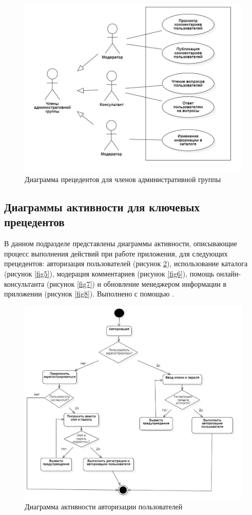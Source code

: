 \documentclass[14pt]{extreport}
\begin{document}
\begin{figure}[H]
\centerline{\includegraphics[width=0.7\linewidth]{adm}}
\caption{Диаграмма прецедентов для членов административной группы}
\label{fig3}
\end{figure}

\newpage
\subsection{Диаграммы активности для ключевых прецедентов}

В данном подразделе представлены диаграммы активности, описывающие процесс выполнения действий при работе приложения, для следующих прецедентов: авторизация пользователей (рисунок \ref{fig4}), использование каталога (рисунок \ref{fig5}), модерация комментариев (рисунок \ref{fig6}), помощь онлайн-консультанта (рисунок \ref{fig7}) и обновление менеджером информации в приложении (рисунок \ref{fig8}). Выполнено с помощью \cite{bib4}.

\begin{figure}[H]
\centerline{\includegraphics[width=1\linewidth]{act_avto}}
\caption{Диаграмма активности авторизации пользователей}
\label{fig4}
\end{figure}
\end{document}

